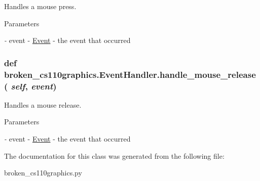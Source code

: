 Handles a mouse press. 
\begin{DoxyParams}{Parameters}
\item[{\em -\/}]event -\/ \hyperlink{classbroken__cs110graphics_1_1Event}{Event} -\/ the event that occurred \end{DoxyParams}
\hypertarget{classbroken__cs110graphics_1_1EventHandler_afcea459e9461ca35ba664d240767b0cc}{
\subsubsection[{handle\_\-mouse\_\-release}]{\setlength{\rightskip}{0pt plus 5cm}def broken\_\-cs110graphics.EventHandler.handle\_\-mouse\_\-release ( {\em self}, \/   {\em event})}}
\label{classbroken__cs110graphics_1_1EventHandler_afcea459e9461ca35ba664d240767b0cc}


Handles a mouse release. 
\begin{DoxyParams}{Parameters}
\item[{\em -\/}]event -\/ \hyperlink{classbroken__cs110graphics_1_1Event}{Event} -\/ the event that occurred \end{DoxyParams}


The documentation for this class was generated from the following file:\begin{DoxyCompactItemize}
\item 
broken\_\-cs110graphics.py\end{DoxyCompactItemize}
